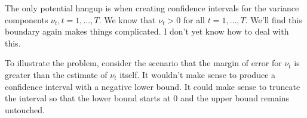 \documentclass{article}
\begin{document}
The only potential hangup is when creating confidence intervals for the variance components $\nu_t, t=1,...,T$.  We know that $\nu_t >0$ for all $t=1,...,T$. We'll find this boundary again makes things complicated. I don't yet know how to deal with this.  

To illustrate the problem, consider the scenario that the margin of error for $\nu_t$ is greater than the estimate of $\nu_t$ itself. It wouldn't make sense to produce a confidence interval with a negative lower bound. It could make sense to truncate the interval so that the lower bound starts at 0 and the upper bound remains untouched.  


%
%
%
%
%







\appendix
\end{document}

